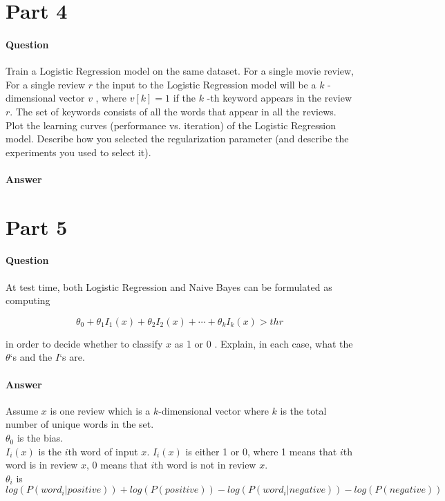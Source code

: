 \documentclass[11pt,twoside]{article}
\begin{document}
\section*{Part 4}
\paragraph{Question}
Train a Logistic Regression model on the same dataset. For a single movie review, For a single review $r$ the input to the Logistic Regression model will be a $k$ -dimensional vector $v$ , where $v[k]=1$ if the $k$ -th keyword appears in the review $r$. The set of keywords consists of all the words that appear in all the reviews.\\

Plot the learning curves (performance vs. iteration) of the Logistic Regression model. Describe how you selected the regularization parameter (and describe the experiments you used to select it).

\paragraph{Answer}

\clearpage

\section*{Part 5}
\paragraph{Question}
At test time, both Logistic Regression and Naive Bayes can be formulated as computing

\[\theta_0+\theta_1I_1(x)+\theta_2I_2(x)+\cdots+\theta_kI_k(x) > thr\]

in order to decide whether to classify $x$ as 1 or 0 . Explain, in each case, what the $\theta$‘s and the $I$‘s are.

\paragraph{Answer}
Assume $x$ is one review which is a $k$-dimensional vector where $k$ is the total number of unique words in the set.\\
$\theta_0$ is the bias.\\
$I_i(x)$ is the $i$th word of input $x$. $I_i(x)$ is either 1 or 0, where 1 means that $i$th word is in review $x$, 0 means that $i$th word is not in review $x$.\\
$\theta_i$ is $log(P(word_i | positive)) + log(P(positive)) - log(P(word_i | negative)) - log(P(negative))$
\clearpage
\end{document}
